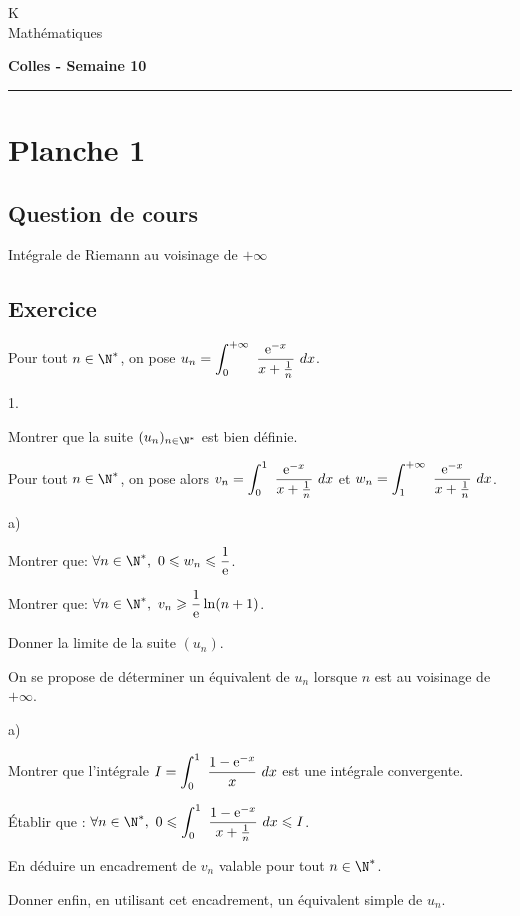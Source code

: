 \documentclass[11pt]{article}%
\begin{document}
\begin{flushleft}
K \\
Mathématiques
\end{flushleft}

\begin{center}
\textbf{\Large{Colles - Semaine 10}}
\end{center}

\hrule

\vspace*{0,2cm}

\section*{Planche 1}

\subsection*{Question de cours}

\noindent
Intégrale de Riemann au voisinage de $+\infty$


\subsection*{Exercice}

\noindent
Pour tout $n\in\N^{*}$, on pose $
u_{n} = \displaystyle \int_{0}^{+\infty}\ \dfrac{\text{e}^{-x}}{x+\frac{1}{n}}\ dx$.

\begin{noliste}{1.}
\item Montrer que la suite $(u_{n})_{n\in\N^{*}}$ est bien définie.
\item Pour tout $n\in\N^{*}$, on pose alors $
v_{n}=\displaystyle \int_{0}^{1}\ \dfrac{\text{e}^{-x}}{x+\frac{1}{n}}\ dx$
et $w_{n}=\displaystyle \int_{1}^{+\infty}\ \dfrac{\text{e}^{-x}}{x+\frac{1}{n}}\ dx$.

\begin{noliste}{a)}
\item Montrer que: $\forall n\in\N^{*}, \ 0\leq w_{n} \leq \dfrac{1}{\ee}$.
\item Montrer que: $\forall n\in\N^{*},\ v_{n}\geq \dfrac{1}{\ee}\ln(n+1)$.
\item Donner la limite de la suite $(u_{n})$.
\end{noliste}
\item On se propose de déterminer un équivalent de $u_{n}$ lorsque $n$
est au voisinage de $+\infty$.

\begin{noliste}{a)}
\item Montrer que l'intégrale $I=\displaystyle \int_{0}^{1}\ \dfrac{1-\text{e}^{-x}}{x} \ dx$
est une intégrale convergente.
\item Établir que : $\forall n \in \N^{*}, \ 0 \leq \dint{0}{1} 
\dfrac{1-\ee^{-x}}{x+\frac{1}{n}} \dx \leq I$.
\item En déduire un encadrement de $v_{n}$ valable pour tout 
$n\in\N^{*}$.
\item Donner enfin, en utilisant cet encadrement, un équivalent simple 
de $u_{n}$.
\end{noliste}
\end{noliste}
\end{document}
